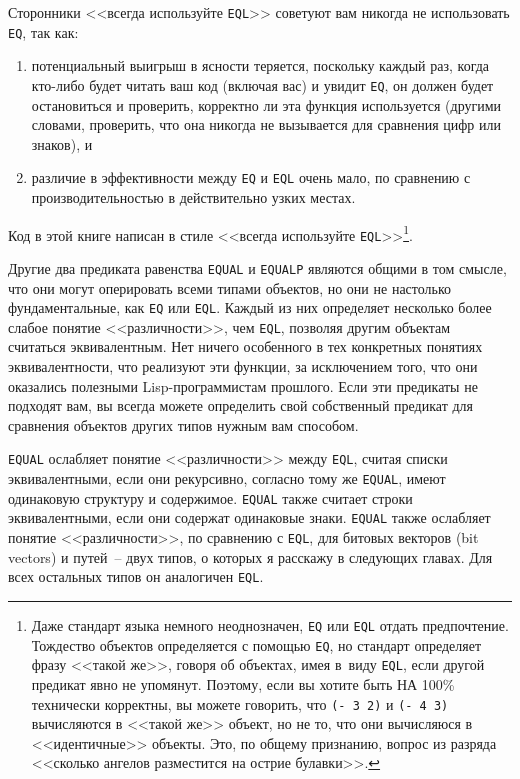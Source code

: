 Сторонники <<всегда используйте \lstinline{EQL}>> советуют вам никогда не использовать
\lstinline{EQ}, так как:

\begin{enumerate}
\item потенциальный выигрыш в ясности теряется, поскольку каждый раз, когда кто-либо
  будет читать ваш код (включая вас) и увидит \lstinline{EQ}, он должен будет остановиться и
  проверить, корректно ли эта функция используется (другими словами, проверить, что она
  никогда не вызывается для сравнения цифр или знаков), и
\item различие в эффективности между \lstinline{EQ} и \lstinline{EQL} очень мало, по
  сравнению с производительностью в действительно узких местах.
\end{enumerate}

Код в этой книге написан в стиле <<всегда используйте \lstinline{EQL}>>\footnote{Даже стандарт
  языка немного неоднозначен, \lstinline{EQ} или \lstinline{EQL} отдать предпочтение. Тождество
  объектов определяется с помощью \lstinline{EQ}, но стандарт определяет фразу <<такой же>>,
  говоря об объектах, имея в~виду \lstinline{EQL}, если другой предикат явно не
  упомянут. Поэтому, если вы хотите быть НА 100\% технически корректны, вы можете говорить,
  что \lstinline{(- 3 2)} и \lstinline{(- 4 3)} вычисляются в <<такой же>> объект, но не то, что они
  вычисляюся в <<идентичные>> объекты. Это, по общему признанию, вопрос из разряда <<сколько
  ангелов разместится на острие булавки>>.}.

Другие два предиката равенства \lstinline{EQUAL} и \lstinline{EQUALP} являются общими в том
смысле, что они могут оперировать всеми типами объектов, но они не настолько
фундаментальные, как \lstinline{EQ} или \lstinline{EQL}. Каждый из них определяет несколько
более слабое понятие <<различности>>, чем \lstinline{EQL}, позволяя другим объектам считаться
эквивалентным. Нет ничего особенного в тех конкретных понятиях эквивалентности, что
реализуют эти функции, за исключением того, что они оказались полезными Lisp-программистам
прошлого. Если эти предикаты не подходят вам, вы всегда можете определить свой собственный
предикат для сравнения объектов других типов нужным вам способом.

\lstinline{EQUAL} ослабляет понятие <<различности>> между \lstinline{EQL}, считая списки
эквивалентными, если они рекурсивно, согласно тому же \lstinline{EQUAL}, имеют одинаковую
структуру и содержимое. \lstinline{EQUAL} также считает строки эквивалентными, если они
содержат одинаковые знаки. \lstinline{EQUAL} также ослабляет понятие <<различности>>, по
сравнению с \lstinline{EQL}, для битовых векторов (bit vectors) и путей~-- двух типов, о
которых я расскажу в следующих главах. Для всех остальных типов он аналогичен
\lstinline{EQL}.

